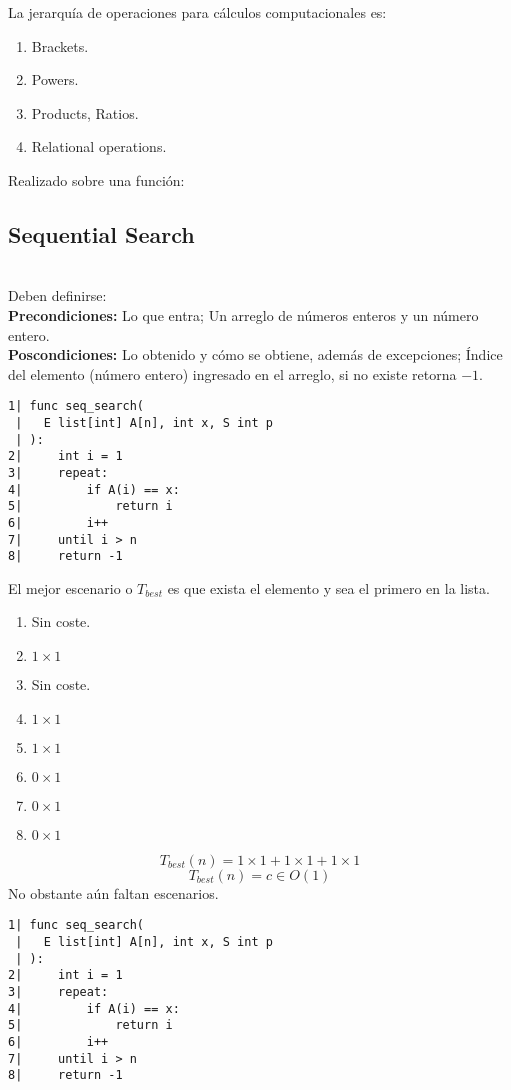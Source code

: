 \documentclass[tikz,11pt,fleqn]{book} %
\begin{document}
La jerarquía de operaciones para cálculos computacionales es:
\begin{enumerate}
	\item Brackets.
	\item Powers.
	\item Products, Ratios.
	\item Relational operations.
\end{enumerate}

Realizado sobre una función:
\subsection{Sequential Search}
\begin{example}~
	\\Deben definirse:
	\\\textbf{Precondiciones:} Lo que entra; Un arreglo de números enteros y un número entero.
	\\\textbf{Poscondiciones:} Lo obtenido y cómo se obtiene, además de excepciones; Índice del elemento (número entero) ingresado en el arreglo, si no existe retorna $-1$.

	\begin{multicols}{2}
		\begin{lstlisting}
1| func seq_search(
 |   E list[int] A[n], int x, S int p
 | ):
2|     int i = 1
3|     repeat:
4|         if A(i) == x:
5|             return i
6|         i++
7|     until i > n
8|     return -1
        \end{lstlisting}

		\columnbreak
		El mejor escenario o $T_{best}$ es que exista el elemento y sea el primero en la lista.
		\begin{enumerate}
			\item Sin coste.
			\item $1\times1$
			\item Sin coste.
			\item $1\times1$
			\item $1\times1$
			\item $0\times1$
			\item $0\times1$
			\item $0\times1$
		\end{enumerate}
	\end{multicols}

	$$
		T_{best}(n)=1\times1+1\times1+1\times1
	$$ $$
		T_{best}(n)=c\in O(1)
	$$
	No obstante aún faltan escenarios.
	\begin{multicols}{2}
		\begin{lstlisting}
1| func seq_search(
 |   E list[int] A[n], int x, S int p
 | ):
2|     int i = 1
3|     repeat:
4|         if A(i) == x:
5|             return i
6|         i++
7|     until i > n
8|     return -1
        \end{lstlisting}


\end{multicols}
\end{example}
\end{document}
